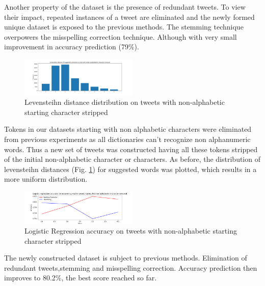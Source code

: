 \documentclass[10pt,conference,compsocconf]{IEEEtran}
\begin{document}
Another property of the dataset is the presence of redundant tweets. To view their impact, repeated instances of a tweet are eliminated and the newly formed unique dataset is exposed to the previous methods. The stemming technique overpowers the misspelling correction technique. Although with very small improvement in accuracy prediction (79\%).

\begin{figure}[!htb]
	\centering \includegraphics[width=0.5\textwidth]{../plots/distributionB.png}
	\caption{Levensteihn distance distribution on tweets with non-alphabetic starting character stripped}
	\label{levDistB}
\end{figure}

Tokens in our datasets starting with non alphabetic characters were eliminated from previous experiments as all dictionaries can't recognize non alphanumeric words. Thus a new set of tweets was constructed having all these tokens stripped of the initial non-alphabetic character or characters. As before, the distribution of levensteihn distances (Fig. \ref{levDistB}) for suggested words was plotted, which results in a more uniform distribution.

\begin{figure}[!htb]
	\centering \includegraphics[width=0.5\textwidth]{../plots/filtered_text.png}
	\caption{Logistic Regression accuracy on tweets with non-alphabetic starting character stripped }
	\label{filtered}
\end{figure}

The newly constructed dataset is subject to previous methods. Elimination of redundant tweets,stemming and misspelling correction. Accuracy prediction then improves to 80.2\%, the best score reached so far.
\end{document}
